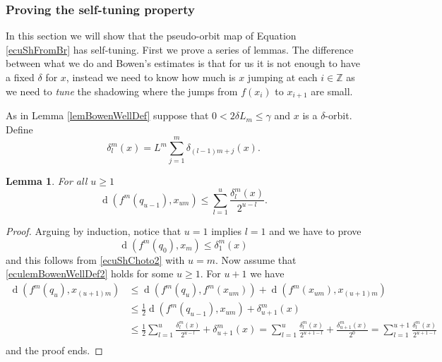 \documentclass[12pt]{amsart}
\theoremstyle{plain}
\newtheorem{lem}[thm]{Lemma}
\theoremstyle{definition}
\theoremstyle{remark}
\DeclareMathOperator{\dist}{d}
\newcommand{\Z}{\mathbb Z}
\begin{document}
\subsubsection{Proving the self-tuning property}
\label{secBowenBr}
In this section we will show that the pseudo-orbit map of Equation \eqref{ecuShFromBr} has self-tuning. First we prove a series of lemmas. The difference between what we do and Bowen's estimates is that for us it is not enough to have a fixed $\delta$ for $x$, instead we need to know how much is $x$ jumping at each $i\in\Z$ as we need to \textit{tune} the shadowing where the jumps from $f(x_i)$ to $x_{i+1}$ are small.

As in Lemma \ref{lemBowenWellDef} suppose that
$0<2\delta L_m\leq\gamma$ and $x$ is a $\delta$-orbit.
Define
\[
\delta_l^m(x)=L^m\sum_{j=1}^m\delta_{(l-1)m+j}(x).
\]

\begin{lem}
	\label{lemBowenWellDef2}
	For all $u\geq 1$
	\begin{equation}
		\label{eculemBowenWellDef2}
		\dist(f^m(q_{u-1}),x_{um})
		\leq
		\sum_{l=1}^u\frac{\delta_l^m(x)}{2^{u-l}}.
	\end{equation}
\end{lem}


\begin{proof}
	Arguing by induction, notice that $u=1$ implies $l=1$ and
	we have to prove
	$$
	\dist(f^m(q_{0}),x_{m})
	\leq \delta_1^m(x)
	$$
	and this follows from \eqref{ecuShChoto2} with $u=m$. Now assume that
	\eqref{eculemBowenWellDef2} holds for some $u\geq 1$. For $u+1$ we have
	\begin{align*}
		\dist(f^m(q_u),x_{(u+1)m}) & \leq
		\dist(f^m(q_u),f^m(x_{um}))
		+
		\dist(f^m(x_{um}),x_{(u+1)m})\\
		& \leq \frac{1}{2}\dist(f^m(q_{u-1}),x_{um})
		+
		\delta_{u+1}^m(x)\\
		& \leq
		\frac12 \sum_{l=1}^u\frac{\delta_l^m(x)}{2^{u-l}}
		+
		\delta_{u+1}^m(x)
		=
		\sum_{l=1}^u\frac{\delta_l^m(x)}{2^{u+1-l}}
		+
		\frac{\delta_{u+1}^m(x)}{2^0}=\sum_{l=1}^{u+1}\frac{\delta_l^m(x)}{2^{u+1-l}}\\
	\end{align*}
	and the proof ends.
\end{proof}
\end{document}
